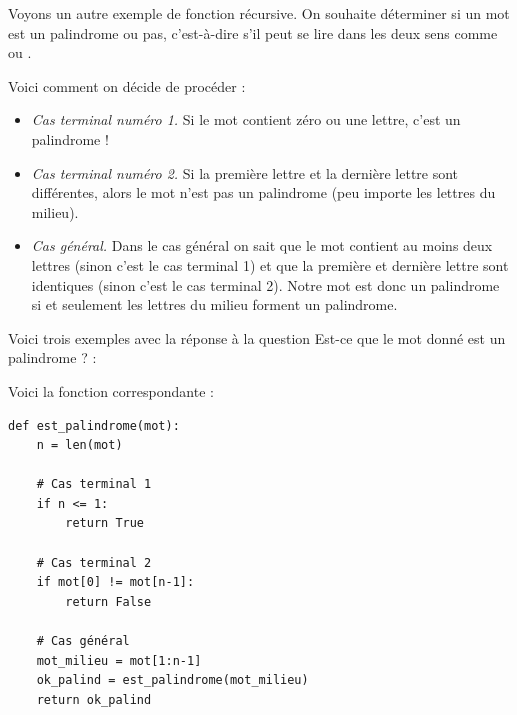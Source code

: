 \documentclass[11pt,class=report,crop=false]{standalone}
\begin{document}
\begin{cours}
Voyons un autre exemple de fonction récursive.
On souhaite déterminer si un mot est un palindrome ou pas, c'est-à-dire s'il peut se lire dans les deux sens comme  ou .

Voici comment on décide de procéder :
\begin{itemize} 
  \item \emph{Cas terminal numéro 1.} Si le mot contient zéro ou une lettre, c'est un palindrome !
  \item \emph{Cas terminal numéro 2.} Si la première lettre et la dernière lettre sont différentes, alors le mot n'est pas un palindrome (peu importe les lettres du milieu).
  \item \emph{Cas général.} Dans le cas général on sait que le mot contient au moins deux lettres (sinon c'est le cas terminal 1) et que la première et dernière lettre sont identiques (sinon c'est le cas terminal 2). Notre mot est donc un palindrome si et seulement les lettres \og{}du milieu\fg{} forment un palindrome.
\end{itemize}

Voici trois exemples avec la réponse à la question \og{}Est-ce que le mot donné est un palindrome ?\fg{} :



Voici la fonction correspondante :
\begin{center}
\begin{lstlisting}
def est_palindrome(mot):
    n = len(mot)
    
    # Cas terminal 1
    if n <= 1:
        return True

    # Cas terminal 2
    if mot[0] != mot[n-1]:
        return False

    # Cas général
    mot_milieu = mot[1:n-1]
    ok_palind = est_palindrome(mot_milieu)    
    return ok_palind
\end{lstlisting}
\end{center}


\end{cours}
\end{document}
